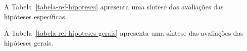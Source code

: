 



\AprovacaoHipoteseResultado{}{}{}{}{}{}{}{}{}


A Tabela~\ref{tabela-ref-hipoteses} apresenta
uma síntese das avaliações das hipóteses específicas.



A Tabela~\ref{tabela-ref-hipoteses-gerais} apresenta
uma síntese das avaliações das hipóteses gerais.


